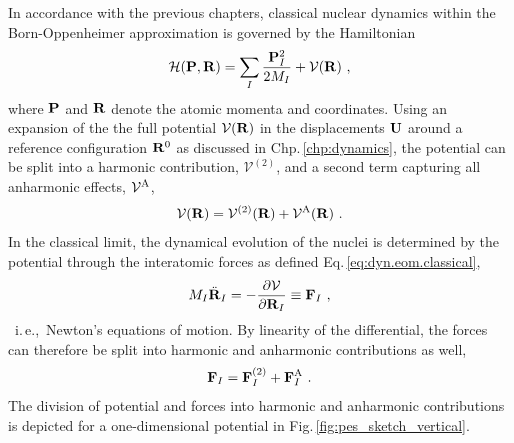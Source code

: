 In accordance with the previous chapters, classical nuclear dynamics within the Born-Oppenheimer approximation is governed by the Hamiltonian
\begin{align}
	\mathcal H ( {\bf P}, {\bf R}) 
		= \sum_I \frac{\b P_I^2}{2 M_I} + \mathcal V (\b R)~,
	\label{eq:anh.H}
\end{align}
where $\bf P$ and $\bf R$ denote the atomic momenta and coordinates. Using an expansion of the the full potential $\mathcal V ({\bf R})$ in the displacements $\bf U$ around a reference configuration ${\bf R}^0$ as discussed in Chp.\,\ref{chp:dynamics}, the potential can be split into a harmonic contribution, $\mathcal V^{(2)}$, and a second term capturing all anharmonic effects, $\mathcal V^{\rm A}$,
\begin{align}
	\mathcal V ({\bf R})
		= \mathcal V^{(2)} ({\bf R}) + \mathcal V^{\rm A} ({\bf R})~.
	\label{eq:anh.V}
\end{align}
In the classical limit, the dynamical evolution of the nuclei is determined by the potential through the interatomic forces as defined Eq.\,\eqref{eq:dyn.eom.classical},
\begin{align}
	M_I \ddot{\bf R}_I
		= -\frac{\partial \mathcal V}{\partial {\bf R}_I}
		\equiv {\bf F}_I~,
\end{align}
~i.\,e.,~Newton's equations of motion. By linearity of the differential, the forces can therefore be split into harmonic and anharmonic contributions as well,
\begin{align}
	{\bf F}_I
		= {\bf F}_I^{(2)} + {\bf F}_I^{\rm A}~.
	\label{eq:anh.F}
\end{align}
The division of potential and forces into harmonic and anharmonic contributions is depicted for a one-dimensional potential in Fig.\,\ref{fig:pes_sketch_vertical}.
